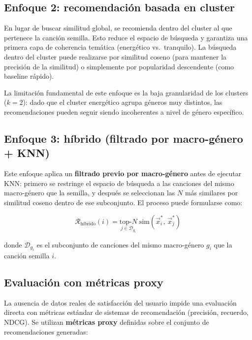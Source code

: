 \documentclass[12pt, a4paper]{book}
\theoremstyle{definition}
\begin{document}
\subsection{Enfoque 2: recomendación basada en cluster}

En lugar de buscar similitud global, se recomienda dentro del cluster al que
pertenece la canción semilla. Esto reduce el espacio de búsqueda y garantiza
una primera capa de coherencia temática (energético vs.\ tranquilo). La
búsqueda dentro del cluster puede realizarse por similitud coseno (para
mantener la precisión de la similitud) o simplemente por popularidad
descendente (como baseline rápido).

La limitación fundamental de este enfoque es la baja granularidad de los
clusters ($k=2$): dado que el cluster energético agrupa géneros muy distintos,
las recomendaciones pueden seguir siendo incoherentes a nivel de género
específico.

\subsection{Enfoque 3: híbrido (filtrado por macro-género + KNN)}

Este enfoque aplica un \textbf{filtrado previo por macro-género} antes de
ejecutar KNN: primero se restringe el espacio de búsqueda a las canciones del
mismo macro-género que la semilla, y después se seleccionan las $N$ más
similares por similitud coseno dentro de ese subconjunto. El proceso puede
formularse como:

\begin{equation}
\label{eq:hibrido}
\mathcal{R}_{\text{híbrido}}(i) =
  \underset{j \in \mathcal{D}_{g_i}}{\text{top-}N}
  \; \text{sim}(\vec{x}_i^*,\, \vec{x}_j^*)
\end{equation}

donde $\mathcal{D}_{g_i}$ es el subconjunto de canciones del mismo
macro-género $g_i$ que la canción semilla $i$.

\subsection{Evaluación con métricas proxy}
\label{sec:metricas_proxy_inicial}

La ausencia de datos reales de satisfacción del usuario impide una evaluación
directa con métricas estándar de sistemas de recomendación (precisión,
recuerdo, NDCG). Se utilizan \textbf{métricas proxy} definidas sobre el
conjunto de recomendaciones generadas:
\end{document}
